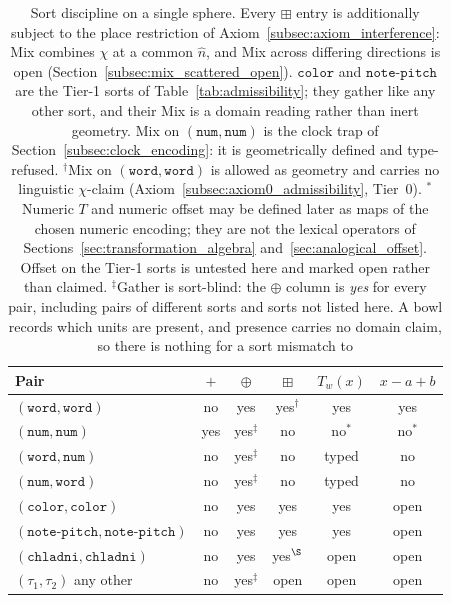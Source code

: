 \documentclass[12pt, a4paper]{article}
\begin{document}
\begin{table}[h]
\centering
\begin{tabular}{lccccc}
\hline
Pair & $+$ & $\oplus$ & $\boxplus$ & $T_w(x)$ & $x-a+b$ \\
\hline
$(\mathtt{word},\mathtt{word})$ & no & yes & yes$^{\dagger}$ & yes & yes \\
$(\mathtt{num},\mathtt{num})$   & yes & yes$^{\ddagger}$ & no  & no$^{*}$ & no$^{*}$ \\
$(\mathtt{word},\mathtt{num})$  & no & yes$^{\ddagger}$ & no  & typed & no \\
$(\mathtt{num},\mathtt{word})$  & no & yes$^{\ddagger}$ & no  & typed & no \\
$(\mathtt{color},\mathtt{color})$ & no & yes & yes & yes & open \\
$(\mathtt{note\text{-}pitch},\mathtt{note\text{-}pitch})$ & no & yes & yes & yes & open \\
$(\mathtt{chladni},\mathtt{chladni})$ & no & yes & yes$^{\S}$ & open & open \\
$(\tau_1,\tau_2)$ any other & no & yes$^{\ddagger}$ & open & open & open \\
\hline
\end{tabular}
\caption{Sort discipline on a single sphere. Every $\boxplus$ entry is
additionally subject to the place restriction of
Axiom~\ref{subsec:axiom_interference}: Mix combines $\chi$ at a common
$\hat n$, and Mix across differing directions is open
(Section~\ref{subsec:mix_scattered_open}).
$\mathtt{color}$ and $\mathtt{note\text{-}pitch}$ are the Tier-1 sorts of
Table~\ref{tab:admissibility}; they gather like any other sort, and
their Mix is a domain reading rather than inert geometry.
Mix on $(\mathtt{num},\mathtt{num})$ is the clock trap of
Section~\ref{subsec:clock_encoding}: it is geometrically defined and
type-refused. $^{\dagger}$Mix on $(\mathtt{word},\mathtt{word})$ is
allowed as geometry and carries no linguistic $\chi$-claim
(Axiom~\ref{subsec:axiom0_admissibility}, Tier~0).
$^{*}$Numeric $T$ and numeric offset may be defined later as
maps of the chosen numeric encoding; they are not the lexical
operators of Sections~\ref{sec:transformation_algebra}
and~\ref{sec:analogical_offset}. Offset on the Tier-1 sorts is
untested here and marked open rather than claimed.
$^{\ddagger}$Gather is sort-blind: the $\oplus$ column is \emph{yes}
for every pair, including pairs of different sorts and sorts not
listed here. A bowl records which units are present, and presence
carries no domain claim, so there is nothing for a sort mismatch to
}
\end{table}
\end{document}
